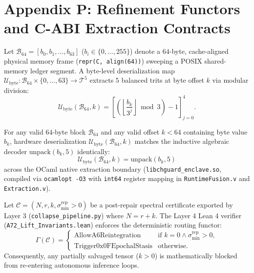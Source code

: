 \section*{Appendix P: Refinement Functors and C-ABI Extraction Contracts}
\label{app:refinement}

\begin{definition}
Let $\mathcal{B}_{64} = [b_0, b_1, \dots, b_{63}]$ ($b_i \in \{0, \dots, 255\}$) denote a $64$-byte, cache-aligned physical memory frame (\texttt{repr(C, align(64))}) sweeping a POSIX shared-memory ledger segment. A byte-level deserialization map $\mathcal{U}_{\mathrm{byte}} : \mathcal{B}_{64} \times \{0, \dots, 63\} \to \mathcal{T}^5$ extracts $5$ balanced trits at byte offset $k$ via modular division:
\begin{equation}
  \mathcal{U}_{\mathrm{byte}}(\mathcal{B}_{64}, k) = \left[ \left(\left\lfloor \frac{b_k}{3^j} \right\rfloor \bmod 3\right) - 1 \right]_{j=0}^4.
\end{equation}
\end{definition}

\begin{theorem}
For any valid $64$-byte block $\mathcal{B}_{64}$ and any valid offset $k < 64$ containing byte value $b_k$, hardware deserialization $\mathcal{U}_{\mathrm{byte}}(\mathcal{B}_{64}, k)$ matches the inductive algebraic decoder $\mathrm{unpack}(b_k, 5)$ identically:
\begin{equation}
  \mathcal{U}_{\mathrm{byte}}(\mathcal{B}_{64}, k) = \mathrm{unpack}(b_k, 5)
\end{equation}
across the OCaml native extraction boundary (\texttt{libchguard\_enclave.so}, compiled via \texttt{ocamlopt -O3} with \texttt{int64} register mapping in \texttt{RuntimeFusion.v} and \texttt{Extraction.v}).
\end{theorem}

\begin{proposition}
Let $\mathcal{C} = (N, r, k, \sigma_{\min}^{\mathrm{rep}} > 0)$ be a post-repair spectral certificate exported by Layer 3 (\texttt{collapse\_pipeline.py}) where $N = r + k$. The Layer 4 Lean 4 verifier (\texttt{A72\_Lift\_Invariants.lean}) enforces the deterministic routing functor:
\begin{equation}
  \Gamma(\mathcal{C}) = \begin{cases}
    \mathrm{AllowA6Reintegration} & \text{if } k = 0 \land \sigma_{\min}^{\mathrm{rep}} > 0, \\
    \mathrm{Trigger0x0FEpochalStasis} & \text{otherwise.}
  \end{cases}
\end{equation}
Consequently, any partially salvaged tensor ($k > 0$) is mathematically blocked from re-entering autonomous inference loops.
\end{proposition}
